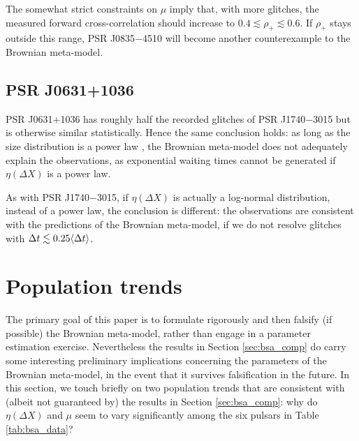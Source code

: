 The somewhat strict constraints on $\mu$ imply that, with more glitches, the measured forward cross-correlation should increase to $0.4 \lesssim \rho_+ \lesssim 0.6$. If $\rho_+$ stays outside this range, PSR J0835$-$4510 will become another counterexample to the Brownian meta-model.

\subsection{PSR J0631+1036}
PSR J0631$+$1036 has roughly half the recorded glitches of PSR J1740$-$3015 but is otherwise similar statistically. Hence the same conclusion holds: as long as the size distribution is a power law \citep{Fuentes2019}, the Brownian meta-model does not adequately explain the observations, as exponential waiting times cannot be generated if $\eta(\Delta X)$ is a power law.

As with PSR J1740$-$3015, if $\eta(\Delta X)$ is actually a log-normal distribution, instead of a power law, the conclusion is different: the observations are consistent with the predictions of the Brownian meta-model, if we do not resolve glitches with $\Delta t \lesssim 0.25 \langle \Delta t \rangle$.

\section{Population trends}
\label{sec:bsa_poptrends}
The primary goal of this paper is to formulate rigorously and then falsify (if possible) the Brownian meta-model, rather than engage in a parameter estimation exercise. Nevertheless the results in Section \ref{sec:bsa_comp} do carry some interesting preliminary implications concerning the parameters of the Brownian meta-model, in the event that it survives falsification in the future. In this section, we touch briefly on two population trends that are consistent with (albeit not guaranteed by) the results in Section \ref{sec:bsa_comp}: why do $\eta(\Delta X)$ and $\mu$ seem to vary significantly among the six pulsars in Table \ref{tab:bsa_data}?

